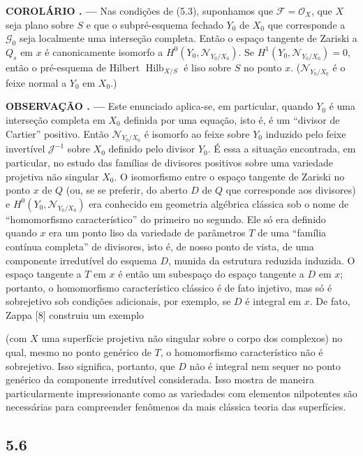 \documentclass[11pt,twoside,openany]{book}
\numberwithin{equation}{section}
\newcommand{\src}[1]{%
  \phantomsection\hypertarget{src:#1}{}%
  \marginpar{\raggedleft\footnotesize\sffamily #1}%
}
\theoremstyle{plain}
\theoremstyle{definition}
\theoremstyle{remark}
\newcommand{\result}[2]{%
  \par\medskip\noindent\textbf{#1%
  \if\relax\detokenize{#2}\relax\else\space#2\fi. ---}\enspace
}
\newcommand{\FgaUnitKey}{frontmatter}
\renewcommand{\src}[1]{%
  \phantomsection\hypertarget{src:\FgaUnitKey:#1}{}%
  \marginpar{\raggedleft\footnotesize\sffamily #1}%
}
\begin{document}
\result{COROLÁRIO}{5.4} Nas condições de (5.3), suponhamos que
$\mathcal F=\mathcal O_X$, que $X$ seja plano sobre $S$ e que o
subpré-esquema fechado $Y_0$ de $X_0$ que corresponde a $\mathcal G_0$ seja
localmente uma interseção completa. Então o espaço tangente de Zariski a $Q_s$
em $x$ é canonicamente isomorfo a
$H^0(Y_0,\mathcal N_{Y_0/X_0})$. Se
$H^1(Y_0,\mathcal N_{Y_0/X_0})=0$, então o pré-esquema de Hilbert
$\operatorname{Hilb}_{X/S}$ é liso sobre $S$ no ponto $x$.
($\mathcal N_{Y_0/X_0}$ é o feixe normal a $Y_0$ em $X_0$.)

\result{OBSERVAÇÃO}{5.5} Este enunciado aplica-se, em particular, quando $Y_0$
é uma interseção completa em $X_0$ definida por uma equação, isto é, é um
``divisor de Cartier'' positivo. Então $\mathcal N_{Y_0/X_0}$ é isomorfo ao
feixe sobre $Y_0$ induzido pelo feixe invertível $\mathcal J^{-1}$ sobre $X_0$
definido pelo divisor $Y_0$. É essa a situação encontrada, em particular, no
estudo das famílias de divisores positivos sobre uma variedade projetiva não
singular $X_0$. O isomorfismo entre o espaço tangente de Zariski no ponto $x$
de $Q$ (ou, se se preferir, do aberto $D$ de $Q$ que corresponde aos divisores)
e $H^0(Y_0,\mathcal N_{Y_0/X_0})$ era conhecido em geometria algébrica
clássica sob o nome de ``homomorfismo característico'' do primeiro no segundo.
Ele só era definido quando $x$ era um ponto liso da variedade de parâmetros
$T$ de uma ``família contínua completa'' de divisores, isto é, de nosso ponto
de vista, de uma componente irredutível do esquema $D$, munida da estrutura
reduzida induzida. O espaço tangente a $T$ em $x$ é então um subespaço do
espaço tangente a $D$ em $x$; portanto, o homomorfismo característico clássico
é de fato injetivo, mas só é sobrejetivo sob condições adicionais, por exemplo,
se $D$ é integral em $x$. De fato, Zappa [8] construiu um exemplo
\src{272}
(com $X$ uma superfície projetiva não singular sobre o corpo dos complexos) no
qual, mesmo no ponto genérico de $T$, o homomorfismo característico não é
sobrejetivo. Isso significa, portanto, que $D$ não é integral nem sequer no
ponto genérico da componente irredutível considerada. Isso mostra de maneira
particularmente impressionante como as variedades com elementos nilpotentes
são necessárias para compreender fenômenos da mais clássica teoria das
superfícies.

\subsection*{5.6}
\end{document}
